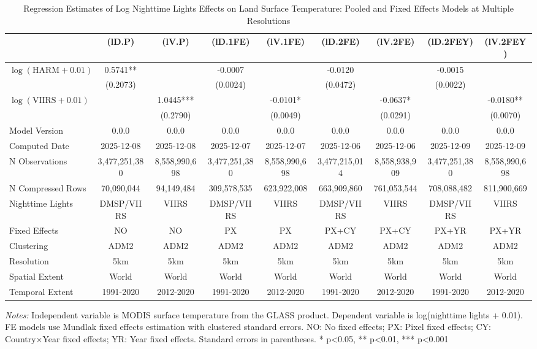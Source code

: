 \begin{table}[htbp]
\centering
\footnotesize
\caption{Regression Estimates of Log Nighttime Lights Effects on Land Surface Temperature: Pooled and Fixed Effects Models at Multiple Resolutions}
\begin{tabular}{lcccccccc}
\toprule
 & (lD.P) & (lV.P) & (lD.1FE) & (lV.1FE) & (lD.2FE) & (lV.2FE) & (lD.2FEY) & (lV.2FEY) \\
\midrule
$\log(\text{HARM} + 0.01)$ & 0.5741** &  & -0.0007 &  & -0.0120 &  & -0.0015 &  \\
 & (0.2073) &  & (0.0024) &  & (0.0472) &  & (0.0022) &  \\
$\log(\text{VIIRS} + 0.01)$ &  & 1.0445*** &  & -0.0101* &  & -0.0637* &  & -0.0180** \\
 &  & (0.2790) &  & (0.0049) &  & (0.0291) &  & (0.0070) \\
\midrule
Model Version & 0.0.0 & 0.0.0 & 0.0.0 & 0.0.0 & 0.0.0 & 0.0.0 & 0.0.0 & 0.0.0 \\
Computed Date & 2025-12-08 & 2025-12-08 & 2025-12-07 & 2025-12-07 & 2025-12-06 & 2025-12-06 & 2025-12-09 & 2025-12-09 \\
N Observations & 3,477,251,380 & 8,558,990,698 & 3,477,251,380 & 8,558,990,698 & 3,477,215,014 & 8,558,938,909 & 3,477,251,380 & 8,558,990,698 \\
N Compressed Rows & 70,090,044 & 94,149,484 & 309,578,535 & 623,922,008 & 663,909,860 & 761,053,544 & 708,088,482 & 811,900,669 \\
\midrule
Nighttime Lights & DMSP/VIIRS & VIIRS & DMSP/VIIRS & VIIRS & DMSP/VIIRS & VIIRS & DMSP/VIIRS & VIIRS \\
Fixed Effects & NO & NO & PX & PX & PX+CY & PX+CY & PX+YR & PX+YR \\
Clustering & ADM2 & ADM2 & ADM2 & ADM2 & ADM2 & ADM2 & ADM2 & ADM2 \\
\cmidrule(lr){1-9}
Resolution & 5km & 5km & 5km & 5km & 5km & 5km & 5km & 5km \\
Spatial Extent & World & World & World & World & World & World & World & World \\
Temporal Extent & 1991-2020 & 2012-2020 & 1991-2020 & 2012-2020 & 1991-2020 & 2012-2020 & 1991-2020 & 2012-2020 \\
\bottomrule
\end{tabular}
\begin{threeparttable}
\begin{tablenotes}\small
\item \textit{Notes:} Independent variable is MODIS surface temperature from the GLASS product. Dependent variable is log(nighttime lights + 0.01). FE models use Mundlak fixed effects estimation with clustered standard errors. NO: No fixed effects; PX: Pixel fixed effects; CY: Country×Year fixed effects; YR: Year fixed effects. Standard errors in parentheses. * p<0.05, ** p<0.01, *** p<0.001
\end{tablenotes}
\end{threeparttable}
\end{table}